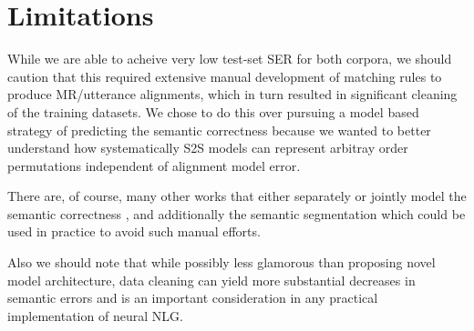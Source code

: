 \section{Limitations}

While we are able to acheive very low test-set SER for both corpora, we 
should caution that this required extensive manual development of matching 
rules to produce MR/utterance alignments, which in turn resulted in 
significant cleaning of the training datasets. We chose to do this over 
pursuing a model based strategy of predicting the semantic correctness
because we wanted to better understand how systematically S2S models can
represent arbitray order permutations independent of alignment model error. 

There are, of course, many other works that either separately or jointly
model the semantic correctness \cite{nie2019,kedzie2019}, and additionally the semantic segmentation \cite{wiseman2018,shen2020,li2020} which
 could be used in practice to avoid such manual efforts.

Also we should note that while possibly less glamorous than proposing novel
model architecture, data cleaning can yield more substantial decreases in
semantic errors \cite{dusek2019,hongminwang2019} and is an important 
consideration in any practical implementation of neural NLG.
